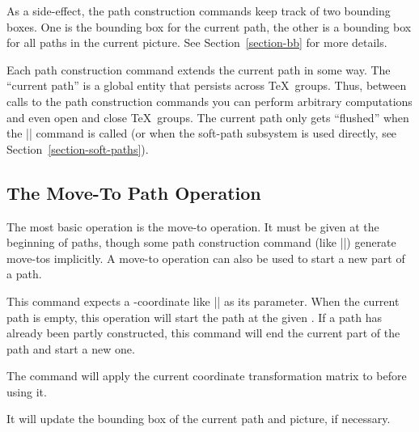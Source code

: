 As a side-effect, the path construction commands keep track of two bounding
boxes. One is the bounding box for the current path, the other is a bounding
box for all paths in the current picture. See Section~\ref{section-bb} for more
details.

Each path construction command extends the current path in some way. The
``current path'' is a global entity that persists across \TeX\ groups. Thus,
between calls to the path construction commands you can perform arbitrary
computations and even open and close \TeX\ groups. The current path only gets
``flushed'' when the |\pgfusepath| command is called (or when the soft-path
subsystem is used directly, see Section~\ref{section-soft-paths}).


\subsection{The Move-To Path Operation}

The most basic operation is the move-to operation. It must be given at the
beginning of paths, though some path construction command (like
|\pgfpathrectangle|) generate move-tos implicitly. A move-to operation can also
be used to start a new part of a path.

\begin{command}{\pgfpathmoveto{}}
    This command expects a \pgfname-coordinate like |\pgfpointorigin| as its
    parameter. When the current path is empty, this operation will start the
    path at the given . If a path has already been partly
    constructed, this command will end the current part of the path and start a
    new one.
\begin{codeexample}[]
\begin{pgfpicture}
  \pgfpathmoveto{\pgfpointorigin}
  \pgfpathlineto{\pgfpoint{1cm}{1cm}}
  \pgfpathlineto{\pgfpoint{2cm}{1cm}}
  \pgfpathlineto{\pgfpoint{3cm}{0.5cm}}
  \pgfpathlineto{\pgfpoint{3cm}{0cm}}
\end{pgfpicture}
\end{codeexample}
\begin{codeexample}[]
\begin{pgfpicture}
  \pgfpathmoveto{\pgfpointorigin}
  \pgfpathlineto{\pgfpoint{1cm}{1cm}}
  \pgfpathlineto{\pgfpoint{2cm}{1cm}}
  \pgfpathmoveto{\pgfpoint{2cm}{1cm}} %
  \pgfpathlineto{\pgfpoint{3cm}{0.5cm}}
  \pgfpathlineto{\pgfpoint{3cm}{0cm}}
\end{pgfpicture}
\end{codeexample}
    The command will apply the current coordinate transformation matrix to
     before using it.

    It will update the bounding box of the current path and picture, if
    necessary.
\end{command}



